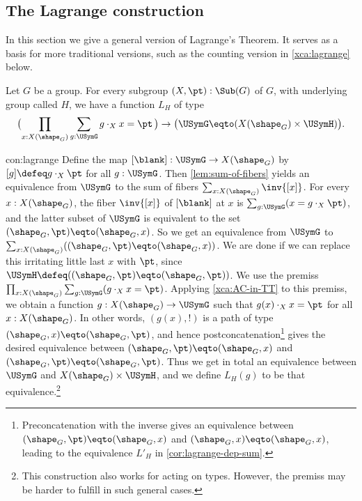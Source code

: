     
\subsection{The Lagrange construction}

In this section we give a general version of Lagrange's Theorem.
It serves as a basis for more traditional versions, such as the
counting version in \cref{xca:lagrange} below.

\begin{construction}\label{con:lagrange}
Let $G$ be a group. For every subgroup $(X,\pt):\Sub(G)$ of $G$,
with underlying group called $H$, we have a function $L_H$ of type
\[
\bigl(\prod_{x:X(\sh_G)}\sum_{g:\USymG} g\cdot_X x = \pt \,\bigr) \to
\bigl(\USymG \eqto (X(\sh_G) \times \USymH)\bigr).
\]
\end{construction}

\begin{implementation}{con:lagrange}
Define the map $[\blank] : \USymG \to X(\sh_G)$ by $[g]\defeq g\cdot_X \pt$
for all $g:\USymG$. Then \cref{lem:sum-of-fibers} yields an
equivalence from $\USymG$ to the sum of fibers
$\sum_{x:X(\sh_G)}\inv{[x]}$.
For every $x:X(\sh_G)$, the fiber $\inv{[x]}$ of $[\blank]$ at $x$ is 
$\sum_{g:\USymG} (x = g\cdot_X \pt)$, and the latter subset
of $\USymG$ is equivalent to the set $(\sh_G,\pt)\eqto(\sh_G,x)$.
So we get an equivalence from $\USymG$ to 
$\sum_{x:X(\sh_G)}((\sh_G,\pt)\eqto(\sh_G,x))$. We are done if
we can replace this irritating little last $x$ with $\pt$, since
$\USymH\defeq((\sh_G,\pt)\eqto(\sh_G,\pt))$.
We use the premiss 
$\prod_{x:X(\sh_G)}\sum_{g:\USymG} (g\cdot_X x = \pt)$.
Applying \cref{xca:AC-in-TT} to this premiss, we obtain
a function $g:X(\sh_G)\to\USymG$ such that $g(x)\cdot_X x = \pt$
for all $x:X(\sh_G)$. In other words, $(g(x),!)$ is a path of type
$(\sh_G,x)\eqto(\sh_G,\pt)$, and hence postconcatenation\footnote{%
\label{ft:lagrange-dep-sum}
Preconcatenation with the inverse gives an equivalence between
$(\sh_G,\pt)\eqto(\sh_G,x)$ and $(\sh_G,x)\eqto(\sh_G,x)$,
leading to the equivalence $L'_H$ in \cref{cor:lagrange-dep-sum}.}
gives the desired equivalence between $(\sh_G,\pt)\eqto(\sh_G,x)$ and 
$(\sh_G,\pt)\eqto(\sh_G,\pt)$. Thus we get in total an equivalence  
between $\USymG$ and $X(\sh_G) \times \USymH$, and we define $L_H(g)$
to be that equivalence.\footnote{This construction also works 
for \inftygps acting on types. However, the premiss may be harder to
fulfill in such general cases.}
\end{implementation}

